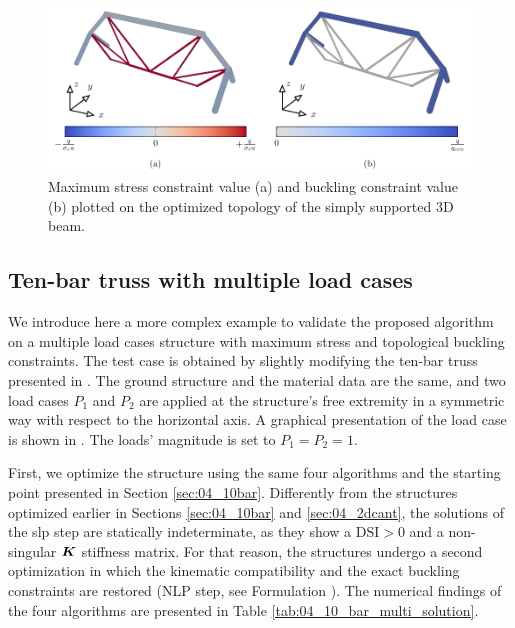\begin{figure}
    \centering
    \includegraphics[width=0.90\linewidth]{figures/04_TTO_improvements/17_supported_3D_mech/support_mech.pdf}
    \caption{Maximum stress constraint value (a) and buckling constraint value (b) plotted on the optimized topology of the simply supported 3D beam.}
    \label{fig:04_3D_supp_mech}
\end{figure}

\subsection{Ten-bar truss with multiple load cases}
\label{sec:04_10multi}

We introduce here a more complex example to validate the proposed algorithm on a multiple load cases structure with maximum stress and topological buckling constraints. The test case is obtained by slightly modifying the ten-bar truss presented in . The ground structure and the material data are the same, and two load cases $P_1$ and $P_2$ are applied at the structure's free extremity in a symmetric way with respect to the horizontal axis. A graphical presentation of the load case is shown in . The loads' magnitude is set to $P_1=P_2=1$.

First, we optimize the structure using the same four algorithms and the starting point presented in Section \ref{sec:04_10bar}. Differently from the structures optimized earlier in Sections \ref{sec:04_10bar} and \ref{sec:04_2dcant}, the solutions of the \gls{slp} step are statically indeterminate, as they show a $\text{DSI}>0$ and a non-singular $\bm{K}$ stiffness matrix. For that reason, the structures undergo a second optimization in which the kinematic compatibility and the exact buckling constraints are restored (NLP step, see Formulation ). The numerical findings of the four algorithms are presented in Table \ref{tab:04_10_bar_multi_solution}.

